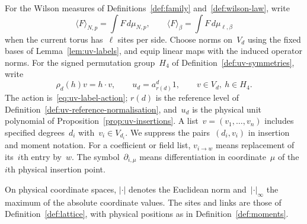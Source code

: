 \begin{definition}\label{def:iv-coefficients}
For the Wilson measures of Definitions~\ref{def:family} and~\ref{def:wilson-law}, write
\begin{equation}\label{eq:iv-expectation}
 \langle F\rangle_{N,p}=\int F\,d\mu_{N,p},\qquad
 \langle F\rangle_\beta=\int F\,d\mu_{\ell,\beta}
\end{equation}
when the current torus has~$\ell$ sites per side.
Choose norms on~$V_d$ using the fixed bases of Lemma~\ref{lem:uv-labels}, and equip linear maps with the induced operator norms.
For the signed permutation group~$H_4$ of Definition~\ref{def:uv-symmetries}, write
\begin{equation*}
 \rho_d(h)v=h\cdot v,\qquad
 u_d=a_{r(d)}^d1,\qquad v\in V_d,\ h\in H_4.
\end{equation*}
The action is~\eqref{eq:uv-label-action}; $r(d)$ is the reference level of Definition~\ref{def:uv-reference-normalisation}, and~$u_d$ is the physical unit polynomial of Proposition~\ref{prop:uv-insertions}.
A list~$v=(v_1,\ldots,v_n)$ includes specified degrees~$d_i$ with~$v_i\in V_{d_i}$.
We suppress the pairs~$(d_i,v_i)$ in insertion and moment notation.
For a coefficient or field list, $v_{i\to w}$ means replacement of its~$i$th entry by~$w$.
The symbol~$\partial_{i,\mu}$ means differentiation in coordinate~$\mu$ of the~$i$th physical insertion point.
\end{definition}

On physical coordinate spaces, $|\cdot|$ denotes the Euclidean norm and~$|\cdot|_\infty$ the maximum of the absolute coordinate values.
The sites and links are those of Definition~\ref{def:lattice}, with physical positions as in Definition~\ref{def:moments}.

